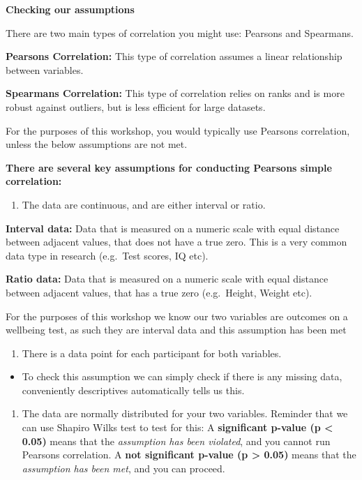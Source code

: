 \documentclass[
]{book}
\providecommand{\tightlist}{%
  \setlength{\itemsep}{0pt}\setlength{\parskip}{0pt}}
\begin{document}
\textbf{Checking our assumptions}

There are two main types of correlation you might use: Pearsons and Spearmans.

\textbf{Pearsons Correlation:} This type of correlation assumes a linear relationship between variables.

\textbf{Spearmans Correlation:} This type of correlation relies on ranks and is more robust against outliers, but is less efficient for large datasets.

For the purposes of this workshop, you would typically use Pearsons correlation, unless the below assumptions are not met.

\textbf{There are several key assumptions for conducting Pearsons simple correlation:}

\begin{enumerate}
\def\labelenumi{\alph{enumi}.}
\tightlist
\item
  The data are continuous, and are either interval or ratio.
\end{enumerate}

\textbf{Interval data:} Data that is measured on a numeric scale with equal distance between adjacent values, that does not have a true zero. This is a very common data type in research (e.g.~Test scores, IQ etc).

\textbf{Ratio data:} Data that is measured on a numeric scale with equal distance between adjacent values, that has a true zero (e.g.~Height, Weight etc).

For the purposes of this workshop we know our two variables are outcomes on a wellbeing test, as such they are interval data and this assumption has been met

\begin{enumerate}
\def\labelenumi{\alph{enumi}.}
\setcounter{enumi}{1}
\tightlist
\item
  There is a data point for each participant for both variables.
\end{enumerate}

\begin{itemize}
\tightlist
\item
  To check this assumption we can simply check if there is any missing data, conveniently descriptives automatically tells us this.
\end{itemize}

\begin{enumerate}
\def\labelenumi{\alph{enumi}.}
\setcounter{enumi}{2}
\tightlist
\item
  The data are normally distributed for your two variables. Reminder that we can use Shapiro Wilks test to test for this: A \textbf{significant p-value (p \textless{} 0.05)} means that the \emph{assumption has been violated}, and you cannot run Pearsons correlation. A \textbf{not significant p-value (p \textgreater{} 0.05)} means that the \emph{assumption has been met}, and you can proceed.
\end{enumerate}
\end{document}
